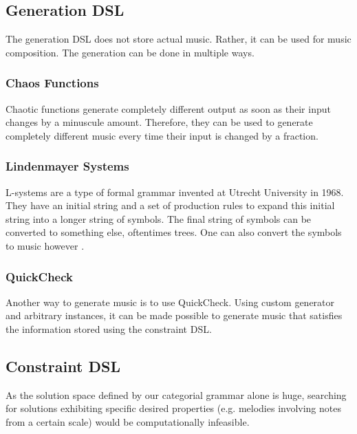 \documentclass[12pt,a4paper]{article}
\newcommand{\site}[1]{\footnote{\url{#1}}}
\begin{document}

\subsection{Generation DSL}
The generation DSL does not store actual music. Rather, it can be used for music composition. The generation can be done in multiple ways.

\subsubsection{Chaos Functions}
Chaotic functions generate completely different output as soon as their input changes by a minuscule amount. Therefore, they can be used to generate completely different music every time their input is changed by a fraction.
\subsubsection{Lindenmayer Systems}
L-systems \cite{lsystem-original} are a type of formal grammar invented at Utrecht University in 1968. They have an initial string and a set of production rules to expand this initial string into a longer string of symbols. The final string of symbols can be converted to something else, oftentimes trees. One can also convert the symbols to music however \cite{lsystem}.
\subsubsection{QuickCheck}
Another way to generate music is to use QuickCheck. Using custom generator and arbitrary instances, it can be made possible to generate music that satisfies the information stored using the constraint DSL.

\subsection{Constraint DSL}
As the solution space defined by our categorial grammar alone is huge, searching for solutions exhibiting specific desired properties (e.g. melodies involving notes from a certain scale) would be computationally infeasible.
\end{document}

